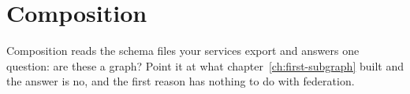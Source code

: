 \chapter{Composition}
\label{ch:composition}

Composition reads the schema files your services export and answers one
question: are these a graph? Point it at what chapter~\ref{ch:first-subgraph}
built and the answer is no, and the first reason has nothing to do with
federation.








